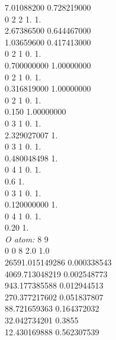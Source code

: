 \documentclass[11pt,DIV=13,BCOR=5mm,a4paper,headinclude]{scrbook}
\begin{document}
\begin{spacing}{0.5}
{7.01088200         0.728219000\\
0 2 2 1. 1.\\

2.67386500         0.644467000\\

1.03659600         0.417413000\\
0 2 1 0. 1.\\

0.700000000          1.00000000\\
0 2 1 0. 1.\\

0.316819000          1.00000000\\
0 2 1 0. 1.\\

0.150          1.00000000\\
0  3  1  0.  1.\\

2.329027007      1.\\
0  3  1  0.  1.\\

0.480048498      1.\\
0  4  1  0.  1.\\

0.6      1.\\
0  3  1  0.  1.\\

0.120000000      1.\\
0  4  1  0.  1.\\

0.20     1.\\

\textit{O atom: }
8 9\\
0 0 8 2.0 1.0\\

26591.015149286   0.000338543\\

4069.713048219    0.002548773\\

943.177385588     0.012944513\\

270.377217602     0.051837807\\

88.721659363      0.164372032\\

32.042734201      0.3855\\

12.430169888      0.562307539\\

}
\end{spacing}
\end{document}
